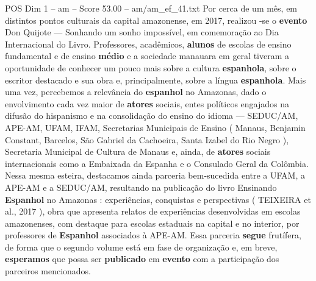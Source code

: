 \begin{textsample}{POS Dim 1 – am – Score 53.00 – am/am\_ef\_41.txt}
Por cerca de um mês, em distintos pontos culturais da capital amazonense, em 2017, realizou -se o \textbf{evento} Don Quijote — Sonhando um sonho impossível, em comemoração ao Dia Internacional do Livro.
Professores, acadêmicos, \textbf{alunos} de escolas de ensino fundamental e de ensino \textbf{médio} e a sociedade manauara em geral tiveram a oportunidade de conhecer um pouco mais sobre a cultura \textbf{espanhola}, sobre o escritor destacado e sua obra e, principalmente, sobre a língua \textbf{espanhola}.
Mais uma vez, percebemos a relevância do \textbf{espanhol} no Amazonas, dado o envolvimento cada vez maior de \textbf{atores} sociais, entes políticos engajados na difusão do hispanismo e na consolidação do ensino do idioma — SEDUC/AM, APE-AM, UFAM, IFAM, Secretarias Municipais de Ensino ( Manaus, Benjamin Constant, Barcelos, São Gabriel da Cachoeira, Santa Izabel do Rio Negro ), Secretaria Municipal de Cultura de Manaus e, ainda, de \textbf{atores} sociais internacionais como a Embaixada da Espanha e o Consulado Geral da Colômbia.
Nessa mesma esteira, destacamos ainda parceria bem-sucedida entre a UFAM, a APE-AM e a SEDUC/AM, resultando na publicação do livro Ensinando \textbf{Espanhol} no Amazonas : experiências, conquistas e perspectivas ( TEIXEIRA et al., 2017 ), obra que apresenta relatos de experiências desenvolvidas em escolas amazonenses, com destaque para escolas estaduais na capital e no interior, por professores de \textbf{Espanhol} associados à APE-AM.
Essa parceria \textbf{segue} frutífera, de forma que o segundo volume está em fase de organização e, em breve, \textbf{esperamos} que possa ser \textbf{publicado} em \textbf{evento} com a participação dos parceiros mencionados.

\end{textsample}
